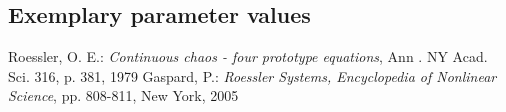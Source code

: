 \documentclass[10pt,a4paper]{article}
\begin{document}
	
	\subsection{Exemplary parameter values}
	

	
	
	\begin{thebibliography}{10}		
		Roessler, O. E.: 
		\textit{Continuous chaos - four prototype equations}, Ann . NY Acad. Sci. 316, p. 381, 1979
		Gaspard, P.: 
		\textit{Roessler Systems, Encyclopedia of Nonlinear Science}, pp. 808-811, New York, 2005
	\end{thebibliography}
\end{document}
